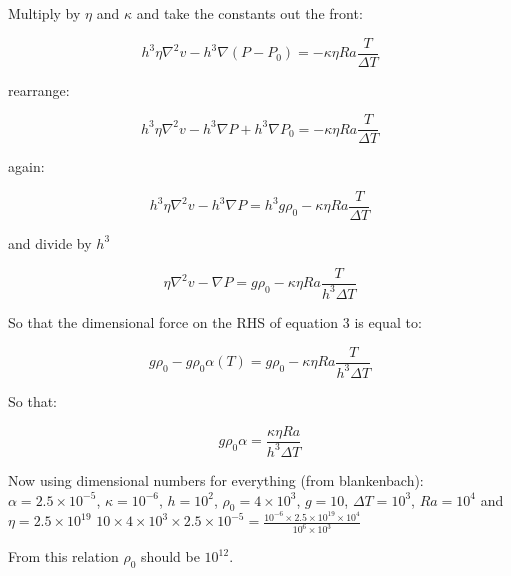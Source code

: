\documentclass[a4paper]{article}
\begin{document}
Multiply by $\eta$ and $\kappa$ and take the constants out the front:

\begin{equation} h^3 \eta \nabla^2 v - h^3 \nabla (P - P_0) = -\kappa \eta Ra\frac{T}{\Delta T}\end{equation} 

rearrange:

\begin{equation} h^3 \eta \nabla^2 v - h^3 \nabla P + h^3 \nabla P_0 = -\kappa \eta Ra\frac{T}{\Delta T}\end{equation} 

again:

\begin{equation} h^3 \eta \nabla^2 v - h^3 \nabla P = h^3 g \rho_0 -\kappa \eta Ra\frac{T}{\Delta T}\end{equation}

and divide by $h^3$

\begin{equation} \eta \nabla^2 v - \nabla P = g \rho_0 - \kappa \eta Ra\frac{T}{h^3 \Delta T}\end{equation}

So that the dimensional force on the RHS of equation 3 is equal to:

\begin{equation} g \rho_0 - g\rho_0 \alpha (T) =  g \rho_0 - \kappa \eta Ra\frac{T}{h^3 \Delta T}\end{equation}

So that:

\begin{equation} g\rho_0 \alpha =  \frac{\kappa \eta Ra}{h^3 \Delta T}\end{equation}

Now using dimensional numbers for everything (from blankenbach):  $\alpha = 2.5\times10^{-5}$, $\kappa = 10^{-6}$, $h = 10^2$, $\rho_0 = 4\times10^{3}$, $g = 10$, $\Delta T = 10^3$, $Ra = 10^4$ and $\eta = 2.5\times10^{19}$
\newline
$10 \times 4\times 10^3 \times 2.5\times10^{-5} = \frac{10^{-6}\times 2.5 \times 10^{19} \times 10^4}{10^6 \times 10^3}$

From this relation $\rho_0$ should be $10^{12}$.

%
%

\end{document}
